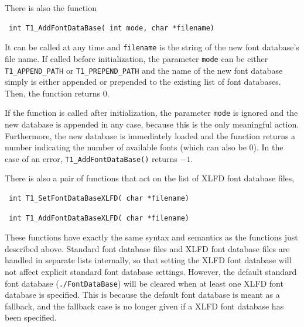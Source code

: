 There is also the function \precorr
\begin{verbatim}
 int T1_AddFontDataBase( int mode, char *filename)
\end{verbatim}\postcorr
It can be called at any time and \verb+filename+ is the string of the new font
database's file name. If called before initialization, the parameter
\verb+mode+ can be either \verb+T1_APPEND_PATH+ or \verb+T1_PREPEND_PATH+ and
the name of the new font database simply is either appended or prepended to
the existing list of font databases. Then, the function returns $0$. 

If the function is called after initialization, the parameter \verb+mode+ is
ignored and the new database is appended in any case, because this is the only
meaningful action. Furthermore, the new database is immediately loaded and the
function returns a number indicating the number of available fonts 
(which can also be 0). In the case of an error, \verb+T1_AddFontDataBase()+
returns $-1$.

There is also a pair of functions that act on the list of XLFD font database
files, 
\precorr
\begin{verbatim}
 int T1_SetFontDataBaseXLFD( char *filename)
\end{verbatim}\postcorr
\precorr
\begin{verbatim}
 int T1_AddFontDataBaseXLFD( char *filename)
\end{verbatim}\postcorr
These functions have exactly the same syntax and semantics as the functions
just described above. Standard font database files and XLFD font database
files are handled in separate lists internally, so that setting the XLFD font
database will not affect explicit standard font database settings.  However,
the default standard font database (\verb+./FontDataBase+) will be cleared
when at least one XLFD font database is specified. This is because the default
font database is meant as a fallback, and the fallback case is no longer given
if a XLFD font database has been specified.

